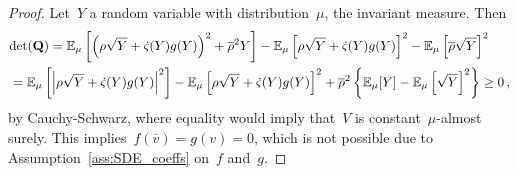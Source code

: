 \begin{proof}
Let~$Y$ a random variable with distribution~$\mu$, the invariant measure. Then 
\begin{align*}
& \mathrm{det}(\boldsymbol{\mathrm{Q}}) = \mathbb{E}_\mu\left[ \left( \rho\sqrt{Y} + \dot{\varsigma}(Y)g(Y)\right)^2 +\overline{\rho}^2 Y \right ]
- \mathbb{E}_\mu\left[ \rho\sqrt{Y} + \dot{\varsigma}(Y)g(Y) \right ]^2
- \mathbb{E}_\mu\left[ \overline{\rho} \sqrt{Y} \right ]^2 \\
&= \mathbb{E}_\mu\left[ \left| \rho\sqrt{Y} + \dot{\varsigma}(Y)g(Y)\right|^2 \right ] - \mathbb{E}_\mu\left[ \rho\sqrt{Y} + \dot{\varsigma}(Y)g(Y) \right ]^2 + \overline{\rho}^2
\left\{\mathbb{E}_\mu[Y]
- \mathbb{E}_\mu\left[\sqrt{Y}\right ]^2\right\}
\geq 0\,,
\end{align*}
by Cauchy-Schwarz, where equality would imply that~$V$ is constant~$\mu$-almost surely. This implies~$f(\overline{v})=g(v)=0$, which is not possible due to Assumption~\ref{ass:SDE_coeffs} on~$f$ and~$g$. 
\end{proof}

